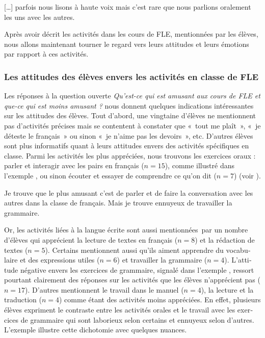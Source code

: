 \documentclass[french, output=paper]{langscibook}
\begin{document}
\begin{otherlanguage}{french}
\ea%
    \label{ex:granfeldt:10}
    {[…]} parfois nous lisons à haute voix mais c’est rare que nous parlions oralement les uns avec les autres. 
\z

Après avoir décrit les activités dans les cours de FLE, mentionnées par les élèves, nous allons maintenant tourner le regard vers leurs attitudes et leurs émotions par rapport à ces activités. 

\subsubsection{Les attitudes des élèves envers les activités en classe de FLE}

Les réponses à la question ouverte \textit{Qu’est-ce qui est amusant aux cours de FLE et que-ce qui est moins amusant ?} nous donnent quelques indications intéressantes sur les attitudes des élèves. Tout d’abord, une vingtaine d’élèves ne mentionnent pas d’activités précises mais se contentent à constater que «~tout me plaît~», «~je déteste le français~» ou sinon «~je n’aime pas les devoirs~», etc. D’autres élèves sont plus informatifs quant à leurs attitudes envers des activités spécifiques en classe. Parmi les activités les plus appréciées, nous trouvons les exercices oraux : parler et interagir avec les pairs en français ($n=15$), comme illustré dans l’exemple , ou sinon écouter et essayer de comprendre ce qu’on dit ($n=7$) (voir \citealt{BusseWilliams2010, Oakes2013}). 

\ea%
    \label{ex:granfeldt:11}
    Je trouve que le plus amusant c’est de parler et de faire la conversation avec les autres dans la classe de français. Mais je trouve ennuyeux de travailler la grammaire.
\z

Or, les activités liées à la langue écrite sont aussi mentionnées~par un nombre d’élèves qui apprécient la lecture de textes en français ($n=8$) et la rédaction de textes ($n=5$). Certains mentionnent aussi qu’ils aiment apprendre du vocabulaire et des expressions utiles ($n=6$) et travailler la grammaire ($n=4$). L’attitude négative envers les exercices de grammaire, signalé dans l’exemple , ressort pourtant clairement des réponses sur les activités que les élèves n’apprécient pas ($n=17$). D’autres mentionnent le travail dans le manuel ($n=4$), la lecture et la traduction ($n=4$) comme étant des activités moins appréciées. En effet, plusieurs élèves expriment le contraste entre les activités orales et le travail avec les exercices de grammaire qui sont laborieux selon certains et ennuyeux selon d’autres. L’exemple  illustre cette dichotomie avec quelques nuances.


\end{otherlanguage}
\end{document}
